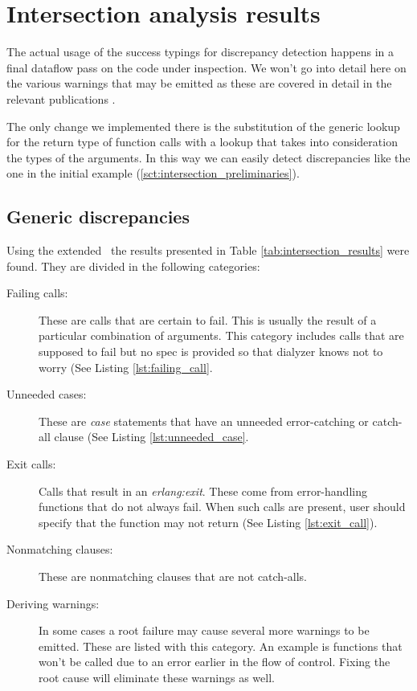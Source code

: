 \section{Intersection analysis results}

The actual usage of the success typings for discrepancy detection
happens in a final dataflow pass on the code under inspection. We
won't go into detail here on the various warnings that may be emitted
as these are covered in detail in the relevant publications
\cite{Elli, SuccessTypings@PPDP-06,
  springerlink:10.1007/978-3-540-30477-7_7}.

The only change we implemented there is the substitution of the
generic lookup for the return type of function calls with a lookup
that takes into consideration the types of the arguments. In this way
we can easily detect discrepancies like the one in the initial example
(\ref{sct:intersection_preliminaries}).

\subsection{Generic discrepancies}

Using the extended \dr\ the results presented in Table
\ref{tab:intersection_results} were found. They are divided in the
following categories:

\begin{description}
\item[Failing calls:] These are calls that are certain to fail. This
  is usually the result of a particular combination of arguments. This
  category includes calls that are supposed to fail but no spec is
  provided so that dialyzer knows not to worry (See Listing
  \ref{lst:failing_call}.
\item[Unneeded cases:] These are \emph{case} statements that have an
  unneeded error-catching or catch-all clause (See Listing
  \ref{lst:unneeded_case}.
\item[Exit calls:] Calls that result in an \emph{erlang:exit}. These
  come from error-handling functions that do not always fail. When
  such calls are present, user should specify that the function may
  not return (See Listing \ref{lst:exit_call}). 
\item[Nonmatching clauses:] These are nonmatching clauses that are not
  catch-alls.
\item[Deriving warnings:] In some cases a root failure may cause
  several more warnings to be emitted. These are listed with this
  category. An example is functions that won't be called due to an
  error earlier in the flow of control. Fixing the root cause will
  eliminate these warnings as well.
\end{description}

